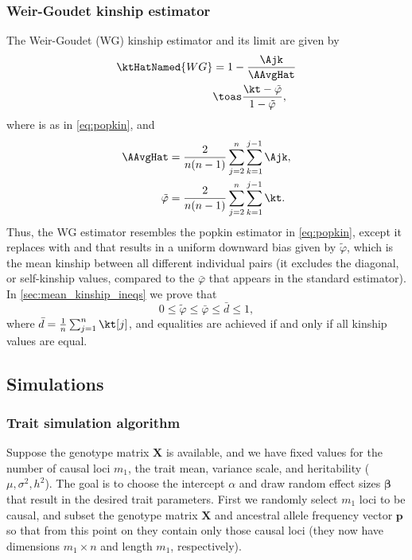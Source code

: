 \documentclass[11pt]{article}
\begin{document}
\subsubsection{Weir-Goudet kinship estimator}

The Weir-Goudet (WG) kinship estimator and its limit are given by \citep{weir_unified_2017, ochoa_estimating_2021}
\begin{align}
  \label{eq:wg}
  \ktHatNamed{WG}
  &=
    1 - \frac{\Ajk}{\AAvgHat}
  \\
  \label{eq:wg_lim}
  &\toas
    \frac{ \kt - \tilde{\varphi} }{ 1 - \tilde{\varphi} }
    ,
\end{align}
where \Ajk is as in \cref{eq:popkin}, and
\begin{equation}
  \label{eq:wg_tilde}
  \begin{split}
    \AAvgHat
    &=
    \frac{2}{n(n-1)}
    \sum_{j=2}^n
    \sum_{k=1}^{j-1}
    \Ajk
    ,\\
    \tilde{\varphi}
    &=
    \frac{2}{n(n-1)}
    \sum_{j=2}^n
    \sum_{k=1}^{j-1}
    \kt
    .
  \end{split}
\end{equation}
Thus, the WG estimator resembles the popkin estimator in \cref{eq:popkin}, except it replaces \AMinHat with \AAvgHat and that results in a uniform downward bias given by $\tilde{\varphi}$, which is the mean kinship between all different individual pairs (it excludes the diagonal, or self-kinship values, compared to the $\bar{\varphi}$ that appears in the standard estimator).
In \cref{sec:mean_kinship_ineqs} we prove that
$$
0 \le \tilde{\varphi} \le \bar{\varphi} \le \bar{d} \le 1,
$$
where $\bar{d} = \frac{1}{n} \sum_{j=1}^n \kt[j]$, and equalities are achieved if and only if all kinship values are equal.

\subsection{Simulations}

\subsubsection{Trait simulation algorithm}

Suppose the genotype matrix $\mathbf{X}$ is available, and we have fixed values for the number of causal loci $m_1$, the trait mean, variance scale, and heritability ($\mu, \sigma^2, h^2$).
The goal is to choose the intercept $\alpha$ and draw random effect sizes $\boldsymbol{\beta}$ that result in the desired trait parameters.
First we randomly select $m_1$ loci to be causal, and subset the genotype matrix $\mathbf{X}$ and ancestral allele frequency vector $\mathbf{p}$ so that from this point on they contain only those causal loci (they now have dimensions $m_1 \times n$ and length $m_1$, respectively).
\end{document}
